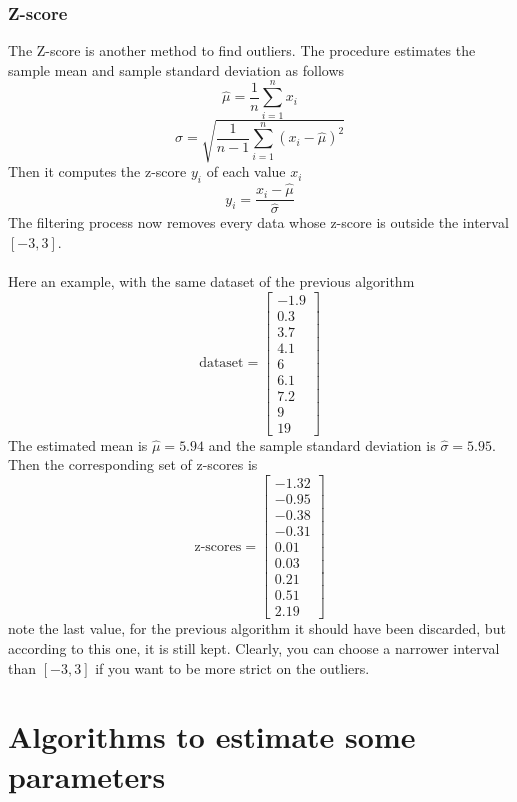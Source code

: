 \documentclass[12pt,twoside]{report}
\begin{document}
\subsection{Z-score}
The Z-score is another method to find outliers. The procedure estimates the sample mean and sample standard deviation as follows
\begin{equation}
    \hat{\mu}=\frac{1}{n}\sum_{i=1}^nx_i
\end{equation}
\begin{equation}
    \hat{\sigma}=\sqrt{\frac{1}{n-1}\sum_{i=1}^n(x_i-\hat{\mu})^2}
\end{equation}
Then it computes the z-score $y_i$ of each value $x_i$
\begin{equation}
    y_i=\frac{x_i-\hat{\mu}}{\hat{\sigma}}
\end{equation}
The filtering process now removes every data whose z-score is outside the interval $[-3,3]$. \\\\
Here an example, with the same dataset of the previous algorithm
$$
\text{dataset}=\begin{bmatrix}
-1.9\\ 
0.3\\ 
3.7\\
4.1\\
6\\
6.1\\
7.2\\
9\\
19
\end{bmatrix}
$$
The estimated mean is $\hat{\mu}=5.94$ and the sample standard deviation is $\hat{\sigma}=5.95$. Then the corresponding set of z-scores is
$$
\text{z-scores}=\begin{bmatrix}
-1.32\\
-0.95\\
-0.38\\
-0.31\\
0.01\\
0.03\\
0.21\\
0.51\\
2.19
\end{bmatrix}
$$
note the last value, for the previous algorithm it should have been discarded, but according to this one, it is still kept. Clearly, you can choose a narrower interval than $[-3,3]$ if you want to be more strict on the outliers.

\clearpage

\chapter{Algorithms to estimate some parameters}
\end{document}
